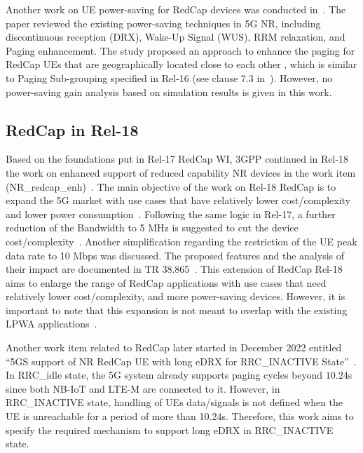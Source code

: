 \documentclass[]{IEEEtran}
\begin{document}
Another work on UE power-saving for RedCap devices was conducted in~\cite{li_radio_2022}. 
The paper reviewed the existing power-saving techniques in 5G NR, including discontinuous reception (DRX), Wake-Up Signal (WUS), RRM relaxation, and Paging enhancement. 
The study proposed an approach to enhance the paging for RedCap UEs that are geographically located close to each other , which is similar to Paging Sub-grouping specified in Rel-16 (see clause 7.3 in~\cite{3gpp_study_nodate-4_38.804}). However, no power-saving gain analysis based on simulation results is given in this work.   

\subsection{RedCap in Rel-18}
Based on the foundations put in Rel-17 RedCap WI, 3GPP continued in Rel-18 the work on enhanced support of reduced capability NR devices in the work item (NR\_redcap\_enh)~\cite{3gpp_revised_2022_RP-223544}.
The main objective of the work on Rel-18 RedCap is to expand the 5G market with use cases that have relatively lower cost/complexity and lower power consumption~\cite{sandeep_narayanan_kadan_veedu_redcap_2023}. 
Following the same logic in Rel-17, a further reduction of the Bandwidth to 5 MHz is suggested to cut the device cost/complexity~\cite{3gpp_revised_2022_RP-223544}. 
Another simplification regarding the restriction of the UE peak data rate to 10 Mbps was discussed. The proposed features and the analysis of their impact are documented in TR 38.865~\cite{3gpp_study_2022_38.865}. This extension of RedCap Rel-18 aims to enlarge the range of RedCap applications with use cases that need relatively lower cost/complexity, and more power-saving devices. However, it is important to note that this expansion is not meant to overlap with the existing LPWA applications~\cite{3gpp_revised_2022_RP-223544}.

Another work item related to RedCap later started in December 2022 entitled ``5GS support of NR RedCap UE with long eDRX for RRC\_INACTIVE State''~\cite{3gpp_5gs_2022_SP-220803}.
In RRC\_idle state, the 5G system already supports paging cycles beyond $10.24$s since both NB-IoT and LTE-M are connected to it. 
However, in RRC\_INACTIVE state, handling of UEs data/signals is not defined when the UE is unreachable for a period of more than 1$0.24$s.
Therefore, this work aims to specify the required mechanism to support long eDRX in RRC\_INACTIVE state.
\end{document}
